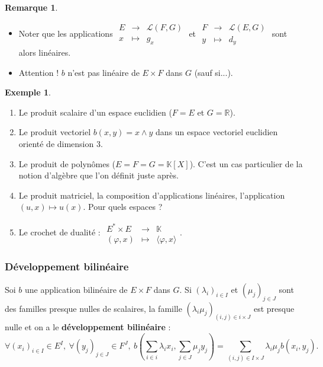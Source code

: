 \documentclass[french]{article}
\newcommand{\R}{\mathbb{R}}
\newcommand{\K}{\mathbb{K}}
\newcommand{\st}{^*}
\theoremstyle{plain}
\theoremstyle{definition}
\newtheorem*{ex}{Exemple}
\newtheorem*{rmq}{Remarque}
\theoremstyle{remark}
\begin{document}
\begin{rmq}
	\begin{itemize}
		\item Noter que les applications $\displaystyle\begin{array}{rcl}
			E&\longrightarrow&\mathcal{L}(F,G)\\
			x&\longmapsto&g_x
		\end{array}$ et $\displaystyle\begin{array}{rcl}
		F&\longrightarrow&\mathcal{L}(E,G)\\
		y&\longmapsto&d_y
		\end{array}$ sont alors linéaires.
		\item Attention ! $b$ n'est pas linéaire de $E\times F$ dans $G$ (sauf si...).
	\end{itemize}
\end{rmq}

\begin{ex}
	\begin{enumerate}
		\item Le produit scalaire d'un espace euclidien ($F=E$ et $G=\R$).
		\item Le produit vectoriel $b(x,y)=x\wedge y$ dans un espace vectoriel euclidien orienté de dimension $3$.
		\item Le produit de polynômes ($E=F=G=\K[X]$). C'est un cas particulier de la notion d'algèbre que l'on définit juste après.
		\item Le produit matriciel, la composition d'applications linéaires, l'application $(u,x)\mapsto u(x)$. Pour quels espaces ?
		\item Le crochet de dualité : $\displaystyle\begin{array}{rcl}
			E\st\times E&\longrightarrow&\K\\
			(\varphi,x)&\longmapsto&\langle\varphi,x\rangle
		\end{array}$.
	\end{enumerate}
\end{ex}

\subsubsection*{Développement bilinéaire}

Soi $b$ une application bilinéaire de $E\times F$ dans $G$. Si $(\lambda_i)_{i\in I}$ et $(\mu_j)_{j\in J}$ sont des familles presque nulles de scalaires, la famille $(\lambda_i\mu_j)_{(i,j)\in i\times J}$ est presque nulle et on a le \textbf{développement bilinéaire} : $$\forall (x_i)_{i\in I}\in E^I,\ \forall (y_j)_{j\in J}\in F^J,\ b\left(\sum_{i\in i}\lambda_ix_i,\sum_{j\in J}\mu_j y_j\right)=\sum_{(i,j)\in I\times J}\lambda_i\mu_j b(x_i,y_j).$$
\end{document}
